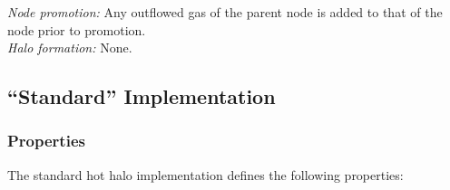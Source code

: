 \noindent\emph{Node promotion:} Any outflowed gas of the parent \gls{node} is added to that of the \gls{node} prior to promotion.\\

\noindent\emph{Halo formation:} None.\\

\subsection{``Standard'' Implementation}

\subsubsection{Properties}

The standard hot halo implementation defines the following properties:
